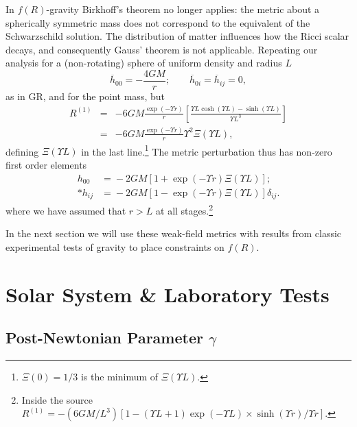 \documentclass[aps,prd,amsfonts,amssymb,amsmath,nofootinbib,reprint,showpacs]{revtex4-1}
\begin{document}
In $f(R)$-gravity Birkhoff's theorem no longer applies: the metric about a spherically symmetric mass does not correspond to the equivalent of the Schwarzschild solution. The distribution of matter influences how the Ricci scalar decays, and consequently Gauss' theorem is not applicable. Repeating our analysis for a (non-rotating) sphere of uniform density and radius $L$
\begin{equation}
\overline{h}_{00} = -\frac{4GM}{r}; \qquad \overline{h}_{0i} = \overline{h}_{ij} = 0,
\end{equation}
as in GR, and for the point mass, but
\begin{eqnarray}
R^{(1)} & = & -6 G M \frac{\exp(- \Upsilon r)}{r}\left[\frac{\Upsilon L\cosh(\Upsilon L) - \sinh(\Upsilon L)}{\Upsilon L^3}\right] \\
 & = &  -6 G M \frac{\exp(- \Upsilon r)}{r}\Upsilon^2\Xi(\Upsilon L),
\end{eqnarray}
defining $\Xi(\Upsilon L)$ in the last line.\footnote{$\Xi(0) = 1/3$ is the minimum of $\Xi(\Upsilon L)$.} The metric perturbation thus has non-zero first order elements~\cite{Stelle1978, Capozziello2009b}
\begin{equation}
\begin{split}
h_{00} & = {} -2 G M \left[1 + \exp(- \Upsilon r)\Xi(\Upsilon L)\right]; \\*
h_{ij} & = {} -2 G M \left[1 - \exp(- \Upsilon r)\Xi(\Upsilon L)\right]\delta_{ij}.
\label{eq:Uniform}
\end{split}
\end{equation}
where we have assumed that $r > L$ at all stages.\footnote{Inside the source $R^{(1)} = -{(6 G M/{L^3})}[1 - (\Upsilon L + 1)\exp(-\Upsilon L) \times\sinh(\Upsilon r)/\Upsilon r]$.}

In the next section we will use these weak-field metrics with results from classic experimental tests of gravity to place constraints on $f(R)$.

\section{Solar System \& Laboratory Tests\label{sec:Tests}}

\subsection{Post-Newtonian Parameter $\gamma$}
\end{document}
